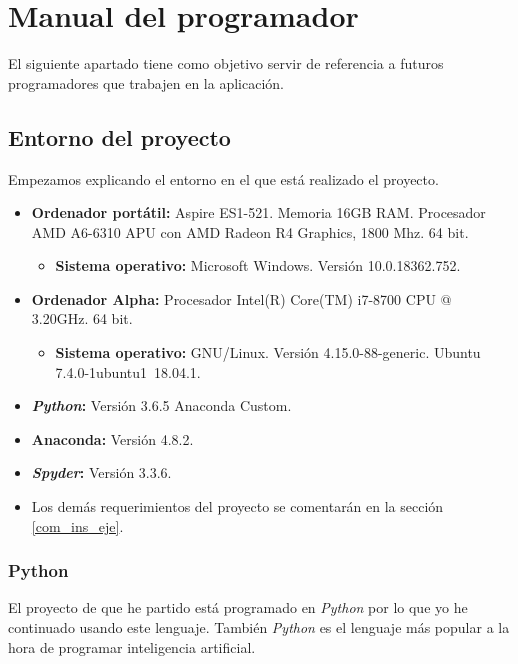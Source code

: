 \newpage

\section{Manual del programador}

El siguiente apartado tiene como objetivo servir de referencia a futuros programadores que trabajen en la aplicación.

\subsection{Entorno del proyecto}

Empezamos explicando el entorno en el que está realizado el proyecto.

\begin{itemize}
    \item \textbf{Ordenador portátil:} Aspire ES1-521. Memoria 16GB RAM. Procesador AMD A6-6310 APU con AMD Radeon R4 Graphics, 1800 Mhz. 64 bit.
    \begin{itemize}
        \item \textbf{Sistema operativo:} Microsoft Windows. Versión 10.0.18362.752.
    \end{itemize}
    
    \item \textbf{Ordenador Alpha:} Procesador Intel(R) Core(TM) i7-8700 CPU @ 3.20GHz. 64 bit.
    \begin{itemize}
        \item \textbf{Sistema operativo:} GNU/Linux. Versión 4.15.0-88-generic. Ubuntu 7.4.0-1ubuntu1~18.04.1.
    \end{itemize}
    \item \textbf{\textit{Python}:} Versión 3.6.5 Anaconda Custom.
    \item \textbf{Anaconda:} Versión 4.8.2.
    \item \textbf{\textit{Spyder}:} Versión 3.3.6.
    \item Los demás requerimientos del proyecto se comentarán en la sección \ref{com_ins_eje}.
\end{itemize}

\subsubsection{Python}

El proyecto de que he partido está programado en \textit{Python} por lo que yo he continuado usando este lenguaje. También \textit{Python} es el lenguaje más popular a la hora de programar inteligencia artificial.

